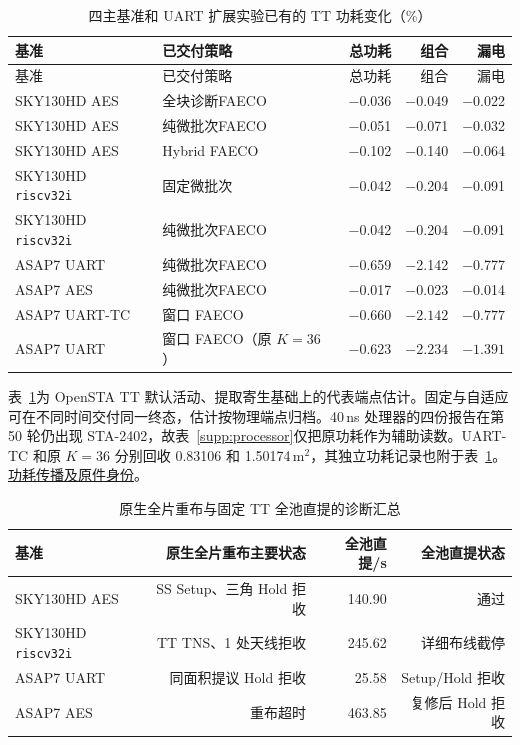 \documentclass[10pt,a4paper,fontset=windows]{ctexart}
\newcommand{\Evidence}[2]{\href{https://github.com/Toylog123/FAECO/blob/f0fe992b9ce44b8368b620d06b8d95a56179347c/project_docs/evidence/#1}{#2}}
\newcommand{\Vfive}[2]{\Evidence{tcad_v5_revision_20261126/#1}{#2}}
\begin{document}
\begin{longtable}{@{}llrrr@{}}
\caption{四主基准和 UART 扩展实验已有的 TT 功耗变化（\%）}\label{supp:power}\\
\toprule
基准 & 已交付策略 & 总功耗 & 组合 & 漏电\\
\midrule
\endfirsthead
\toprule
基准 & 已交付策略 & 总功耗 & 组合 & 漏电\\
\midrule
\endhead
SKY130HD AES & 全块诊断FAECO & $-$0.036 & $-$0.049 & $-$0.022 \\
SKY130HD AES & 纯微批次FAECO & $-$0.051 & $-$0.071 & $-$0.032 \\
SKY130HD AES & Hybrid FAECO & $-$0.102 & $-$0.140 & $-$0.064 \\
SKY130HD \texttt{riscv32i} & 固定微批次 & $-$0.042 & $-$0.204 & $-$0.091 \\
SKY130HD \texttt{riscv32i} & 纯微批次FAECO & $-$0.042 & $-$0.204 & $-$0.091 \\
ASAP7 UART & 纯微批次FAECO & $-$0.659 & $-$2.142 & $-$0.777 \\
ASAP7 AES & 纯微批次FAECO & $-$0.017 & $-$0.023 & $-$0.014 \\
ASAP7 UART-TC & 窗口 FAECO & $-0.660$ & $-2.142$ & $-0.777$ \\
ASAP7 UART & 窗口 FAECO（原 $K=36$） & $-0.623$ & $-2.234$ & $-1.391$ \\
\bottomrule
\end{longtable}

表~\ref{supp:power}为 OpenSTA TT 默认活动、提取寄生基础上的代表端点估计。固定与自适应可在不同时间交付同一终态，估计按物理端点归档。40\,ns 处理器的四份报告在第 50 轮仍出现 STA-2402，故表~\ref{supp:processor}仅把原功耗作为辅助读数。UART-TC 和原 $K=36$ 分别回收 0.83106 和 1.50174\,\textmu m$^2$，其独立功耗记录也附于表~\ref{supp:power}。\Vfive{R4_STAGE5_POWER_TIMING_REPORT.md}{功耗传播及原件身份}。

\begin{longtable}{@{}lrrr@{}}
\caption{原生全片重布与固定 TT 全池直提的诊断汇总}\label{supp:rejects}\\
\toprule
基准 & 原生全片重布主要状态 & 全池直提/s & 全池直提状态\\
\midrule
SKY130HD AES & SS Setup、三角 Hold 拒收 & 140.90 & 通过\\
SKY130HD \texttt{riscv32i} & TT TNS、1 处天线拒收 & 245.62 & 详细布线截停\\
ASAP7 UART & 同面积提议 Hold 拒收 & 25.58 & Setup/Hold 拒收\\
ASAP7 AES & 重布超时 & 463.85 & 复修后 Hold 拒收\\
\bottomrule
\end{longtable}
\end{document}
